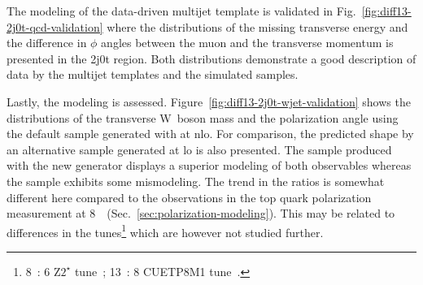 The modeling of the data-driven multijet template is validated in Fig.~\ref{fig:diff13-2j0t-qcd-validation} where the distributions of the missing transverse energy and the difference in $\phi$ angles between the muon and the transverse momentum is presented in the 2j0t region. Both distributions demonstrate a good description of data by the multijet templates and the simulated samples.


Lastly, the \wjets modeling is assessed. Figure~\ref{fig:diff13-2j0t-wjet-validation} shows the distributions of the transverse W~boson mass and the polarization angle using the default \wjets sample generated with \MGAMC at \gls{nlo}. For comparison, the predicted shape by an alternative \wjets sample generated \MG at \gls{lo} is also presented. The sample produced with the new \MGAMC generator displays a superior modeling of both observables whereas the \MG \wjets sample exhibits some mismodeling. The trend in the ratios is somewhat different here compared to the observations in the top quark polarization measurement at 8~\TeV~(Sec.~\ref{sec:polarization-modeling}). This may be related to differences in the \PYTHIA tunes\footnote{8~\TeV: \PYTHIA{}6 $\mathrm{Z2}^\star$ tune~\cite{Chatrchyan:2011id}; 13~\TeV: \PYTHIA{}8 CUETP8M1 tune~\cite{Khachatryan:2015pea}.} which are however not studied further.



